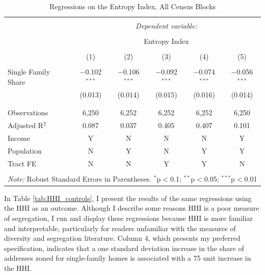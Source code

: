 \documentclass[11pt]{article}
\begin{document}
\begin{table}[!htbp] \centering 
  \caption{Regressions on the Entropy Index, All Census Blocks} 
  \label{tab:entropy_controls} 
\begin{tabular}{@{\extracolsep{5pt}}lccccc} 
\\[-1.8ex]\hline 
\hline \\[-1.8ex] 
 & \multicolumn{5}{c}{\textit{Dependent variable:}} \\ 
\cline{2-6} 
\\[-1.8ex] & \multicolumn{5}{c}{Entropy Index} \\ 
\\[-1.8ex] & (1) & (2) & (3) & (4) & (5)\\ 
\hline \\[-1.8ex] 
 Single Family Share & $-$0.102$^{***}$ & $-$0.106$^{***}$ & $-$0.092$^{***}$ & $-$0.074$^{***}$ & $-$0.056$^{***}$ \\ 
  & (0.013) & (0.014) & (0.015) & (0.016) & (0.014) \\ 
  & & & & & \\ 
\hline \\[-1.8ex] 
Observations & 6,250 & 6,252 & 6,252 & 6,252 & 6,250 \\ 
Adjusted R$^{2}$ & 0.087 & 0.037 & 0.405 & 0.407 & 0.101 \\ 
\hline
Income & Y & N & N & N & Y\\
Population & N & Y & N & Y & Y\\
Tract FE & N & N & Y & Y & N\\
\hline 
\hline \\[-1.8ex] 
\multicolumn{6}{l}{\textit{Note:} Robust Standard Errors in Parentheses. $^{*}$p$<$0.1; $^{**}$p$<$0.05; $^{***}$p$<$0.01} \\ 
\end{tabular} 
\end{table}


In Table \ref{tab:HHI_controls}, I present the results of the same regressions using the HHI as an outcome. Although I describe some reasons HHI is a poor measure of segregation, I run and display these regressions because HHI is more familiar and interpretable, particularly for readers unfamiliar with the measures of diversity and segregation literature. Column 4, which presents my preferred specification, indicates that a one standard deviation increase in the share of addresses zoned for single-family homes is associated with a 75 unit increase in the HHI. 
\end{document}
